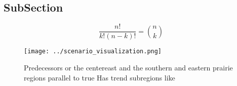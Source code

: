 \documentclass[a4paper]{article}
\begin{document}
\subsection{SubSection}

\[ \frac{n!}{k!(n-k)!} = \binom{n}{k} \]

\begin{figure}
\centering
\texttt{[image: ../scenario\_visualization.png]}
\caption{Predecessors or the centereast and the southern and eastern prairie regions parallel to true Has trend subregions like 
}
\end{figure}
 
\end{document}
